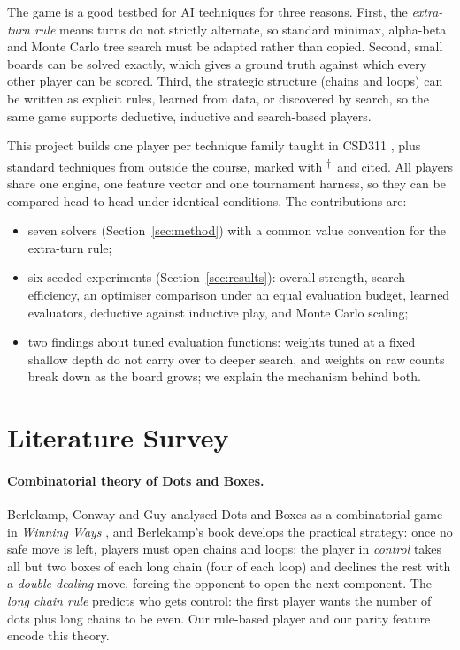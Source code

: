 \documentclass[11pt,a4paper]{article}
\newcommand{\outside}{\textsuperscript{$\dagger$}} %
\begin{document}
The game is a good testbed for AI techniques for three reasons. First, the
\emph{extra-turn rule} means turns do not strictly alternate, so standard minimax,
alpha-beta and Monte Carlo tree search must be adapted rather than copied. Second, small
boards can be solved exactly, which gives a ground truth against which every other
player can be scored. Third, the strategic structure (chains and loops) can be written
as explicit rules, learned from data, or discovered by search, so the same game supports
deductive, inductive and search-based players.

This project builds one player per technique family taught in CSD311 \cite{csd311notes},
plus standard techniques from outside the course, marked with \outside\ and cited.
All players share one engine, one feature vector and one tournament harness, so they can
be compared head-to-head under identical conditions. The contributions are:
\begin{itemize}
\item seven solvers (Section~\ref{sec:method}) with a common value convention for the
  extra-turn rule;
\item six seeded experiments (Section~\ref{sec:results}): overall strength, search
  efficiency, an optimiser comparison under an equal evaluation budget, learned
  evaluators, deductive against inductive play, and Monte Carlo scaling;
\item two findings about tuned evaluation functions: weights tuned at a fixed shallow
  depth do not carry over to deeper search, and weights on raw counts break down as the
  board grows; we explain the mechanism behind both.
\end{itemize}

\section{Literature Survey}

\paragraph{Combinatorial theory of Dots and Boxes.}
Berlekamp, Conway and Guy analysed Dots and Boxes as a combinatorial game in
\emph{Winning Ways} \cite{berlekamp2003winning}, and Berlekamp's book
\cite{berlekamp2000dots} develops the practical strategy: once no safe move is left,
players must open chains and loops; the player in \emph{control} takes all but two boxes
of each long chain (four of each loop) and declines the rest with a
\emph{double-dealing} move, forcing the opponent to open the next component. The
\emph{long chain rule} predicts who gets control: the first player wants the number of
dots plus long chains to be even. Our rule-based player and our parity feature encode
this theory.
\end{document}
